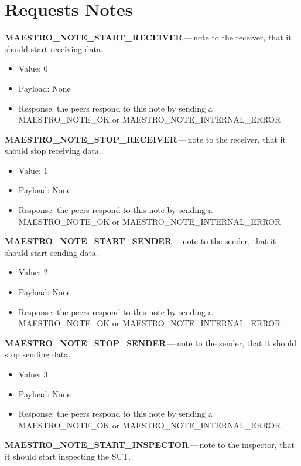 \section*{Requests Notes}
\begin{description}
  \setlength\itemsep{0em}
  \item \textbf{MAESTRO\_NOTE\_START\_RECEIVER}\,---\,note to the receiver, that it should start receiving data.
  \begin{itemize}
    \setlength\itemsep{0em}
    \item Value: 0
    \item Payload: None
    \item Response: the peers respond to this note by sending a MAESTRO\_NOTE\_OK or MAESTRO\_NOTE\_INTERNAL\_ERROR
  \end{itemize}
  \item \textbf{MAESTRO\_NOTE\_STOP\_RECEIVER}\,---\,note to the receiver, that it should stop receiving data.
  \begin{itemize}
    \setlength\itemsep{0em}
    \item Value: 1
    \item Payload: None
    \item Response: the peers respond to this note by sending a MAESTRO\_NOTE\_OK or MAESTRO\_NOTE\_INTERNAL\_ERROR
  \end{itemize}
  \item \textbf{MAESTRO\_NOTE\_START\_SENDER}\,---\,note to the sender, that it should start sending data.
  \begin{itemize}
    \setlength\itemsep{0em}
    \item Value: 2
    \item Payload: None
    \item Response: the peers respond to this note by sending a MAESTRO\_NOTE\_OK or MAESTRO\_NOTE\_INTERNAL\_ERROR
  \end{itemize}
  \item \textbf{MAESTRO\_NOTE\_STOP\_SENDER}\,---\,note to the sender, that it should stop sending data.
  \begin{itemize}
    \setlength\itemsep{0em}
    \item Value: 3
    \item Payload: None
    \item Response: the peers respond to this note by sending a MAESTRO\_NOTE\_OK or MAESTRO\_NOTE\_INTERNAL\_ERROR
  \end{itemize}
  \item \textbf{MAESTRO\_NOTE\_START\_INSPECTOR}\,---\,note to the inspector, that it should start inspecting the SUT.

\end{description}
